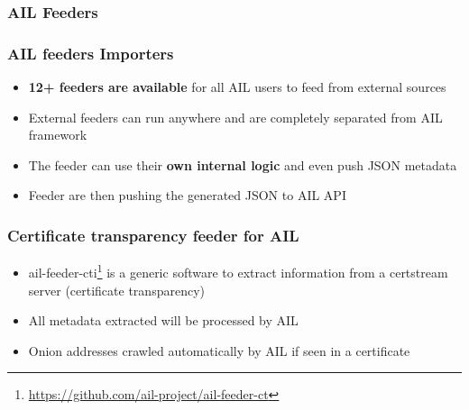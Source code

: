 
\subsubsection{AIL Feeders}

\begin{frame}[fragile]
    \frametitle{AIL feeders Importers}
    \begin{itemize}
        \item {\bf 12+ feeders are available} for all AIL users to feed from external sources
        \item External feeders can run anywhere and are completely separated from AIL framework
        \item The feeder can use their {\bf own internal logic} and even push JSON metadata
        \item Feeder are then pushing the generated JSON to AIL API
    \end{itemize}
\end{frame}


\begin{frame}[fragile]
   \frametitle{Certificate transparency feeder for AIL}
    \begin{itemize}
        \item ail-feeder-cti\footnote{\url{https://github.com/ail-project/ail-feeder-ct}} is a generic software to extract information from a certstream server (certificate transparency)
        \item All metadata extracted will be processed by AIL
        \item Onion addresses crawled automatically by AIL if seen in a certificate 
    \end{itemize}
\end{frame}


